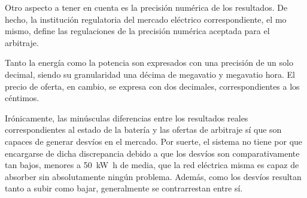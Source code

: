 Otro aspecto a tener en cuenta es la precisión numérica de los resultados. De hecho, la institución regulatoria del mercado eléctrico correspondiente, el \gls{mo} mismo, define las regulaciones de la precisión numérica aceptada para el arbitraje.

Tanto la energía como la potencia son expresados con una precisión de un solo decimal, siendo su granularidad una décima de megavatio y megavatio hora. El precio de oferta, en cambio, se expresa con dos decimales, correspondientes a los céntimos.

Irónicamente, las minúsculas diferencias entre los resultados reales correspondientes al estado de la batería y las ofertas de arbitraje sí que son capaces de generar desvíos en el mercado. Por suerte, el sistema no tiene por que encargarse de dicha discrepancia debido a que los desvíos son comparativamente tan bajos, menores a \SI{50}{{\kilo\watt\hour}} de media, que la red eléctrica misma es capaz de absorber sin absolutamente ningún problema. Además, como los desvíos resultan tanto a subir como bajar, generalmente se contrarrestan entre sí.
